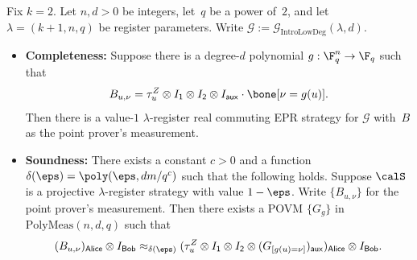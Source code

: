 \documentclass[11pt]{article}
\newcommand{\polymeas}[3]{\mathrm{PolyMeas}(#1,#2,#3)}
\newcommand{\game}{\mathscr{G}}
\newcommand{\reg}[1]{{\mathsf{#1}}}
\begin{document}
\begin{theorem}\label{thm:big-planes-low-degree}
Fix $k = 2$.
Let $n, d>0$ be integers, let~$q$ be a power of~$2$,
and let $\lambda = (k+1, n, q)$ be register parameters.
Write $\game := \game_{\mathrm{IntroLowDeg}}(\lambda, d)$.
\begin{itemize}
\item[$\circ$] \textbf{Completeness:}
		Suppose there is a degree-$d$ polynomial $g:\F_q^{n}\rightarrow \F_q$ such that
		\begin{equation*}
			B_{u, \nu} = \tau_u^Z \otimes I_{\reg{1}} \otimes I_{\reg{2}} \otimes I_{\reg{aux}} \cdot \bone[\nu = g(u)].
		\end{equation*}
		Then there is a value-$1$ $\lambda$-register real
                commuting EPR strategy for $\game$ with~$B$ as the point prover's measurement.
\item[$\circ$] \textbf{Soundness:}
		There exists a constant $c > 0$ and a function $\delta(\eps) = \poly(\eps, dm/q^c)$ such that the following holds.
		Suppose $\calS$ is a projective $\lambda$-register strategy with value $1-\eps$.
		Write $\{B_{u, \nu}\}$ for the point prover's measurement.
		Then there exists a POVM $\{G_g\}$
                in~$\polymeas{n}{d}{q}$ such that
		\begin{equation*}
			(B_{u, \nu})_{\reg{Alice}} \otimes I_{\reg{Bob}}
				\approx_{\delta(\eps)} (\tau^Z_{u}\otimes I_{\reg{1}} \otimes I_{\reg{2}}
					\otimes (G_{[g(u) = \nu]})_{\reg{aux}})_{\reg{Alice}} \otimes I_{\reg{Bob}}.
		\end{equation*}
\end{itemize}
\end{theorem}
\end{document}
